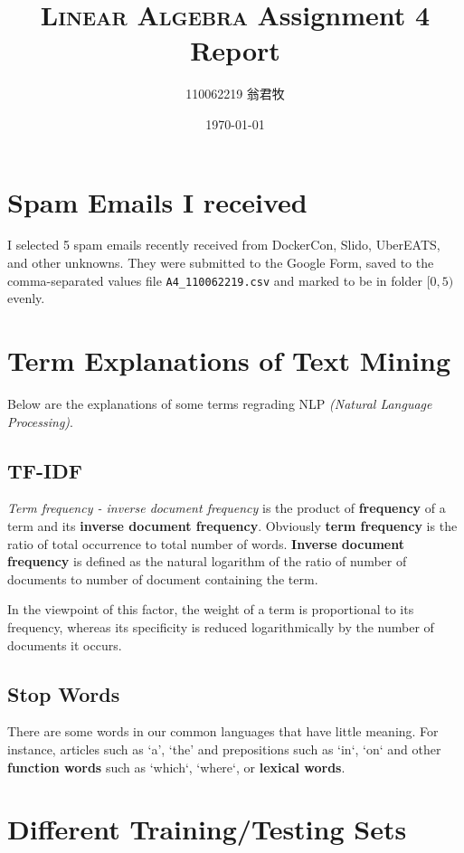 \documentclass[12pt, a4paper]{article}
\title{\textsc{Linear Algebra} Assignment 4 Report}
\author{110062219 翁君牧}
\date{\today}
\begin{document}
\maketitle

\tableofcontents

\section{Spam Emails I received}

I selected 5 spam emails recently received from DockerCon, Slido, UberEATS, and other unknowns. They were submitted to the Google Form, saved to the comma-separated values file \texttt{A4\_110062219.csv} and marked to be in folder $[0,5)$ evenly.

\section{Term Explanations of Text Mining}

Below are the explanations of some terms regrading NLP \textit{(Natural Language Processing)}.

\subsection{TF-IDF}

\textit{Term frequency - inverse document frequency} is the product of \textbf{frequency} of a term and its \textbf{inverse document frequency}. Obviously \textbf{term frequency} is the ratio of total occurrence to total number of words. \textbf{Inverse document frequency} is defined as the natural logarithm of the ratio of number of documents to number of document containing the term.

In the viewpoint of this factor, the weight of a term is proportional to its frequency, whereas its specificity is reduced logarithmically by the number of documents it occurs.

\subsection{Stop Words}

There are some words in our common languages that have little meaning. For instance, articles such as `a', `the' and prepositions such as `in`, `on` and other \textbf{function words} such as `which`, `where`, or \textbf{lexical words}.

\section{Different Training/Testing Sets}
\end{document}
